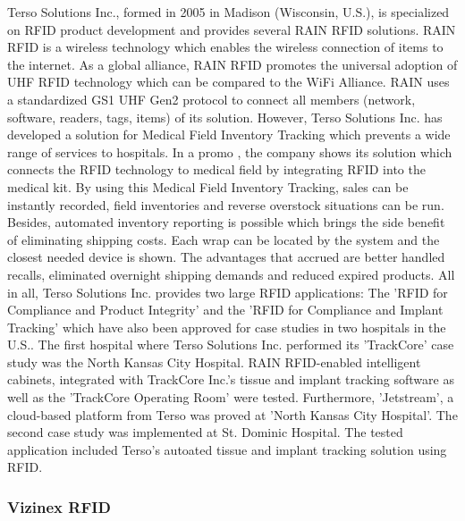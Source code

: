 Terso Solutions Inc., formed in 2005 in Madison (Wisconsin, U.S.), is specialized on RFID product development and provides several \ac{RAIN} RFID solutions. RAIN RFID \cite{rainrfid} is a wireless technology which enables the wireless connection of items to the internet. As a global alliance, RAIN RFID promotes the universal adoption of \ac{UHF} RFID technology which can be compared to the WiFi Alliance. RAIN uses a standardized GS1 UHF Gen2 protocol to connect all members (network, software, readers, tags, items) of its solution.
However, Terso Solutions Inc. has developed a solution for Medical Field Inventory Tracking which prevents a wide range of services to hospitals. In a promo \cite{terso_video}, the company shows its solution which connects the RFID technology to medical field by integrating RFID into the medical kit. By using this Medical Field Inventory Tracking, sales can be instantly recorded, field inventories and reverse overstock situations can be run. Besides, automated inventory reporting is possible which brings the side benefit of eliminating shipping costs. Each wrap can be located by the system and the closest needed device is shown. The advantages that accrued are better handled recalls, eliminated overnight shipping demands and reduced expired products. All in all, Terso Solutions Inc. provides two large RFID applications: The 'RFID for Compliance and Product Integrity' and the 'RFID for Compliance and Implant Tracking' which have also been approved for case studies in two hospitals in the U.S.. The first hospital where Terso Solutions Inc. performed its 'TrackCore' case study was the North Kansas City Hospital. RAIN RFID-enabled intelligent cabinets, integrated with TrackCore Inc.'s tissue and implant tracking software as well as the 'TrackCore Operating Room' were tested. Furthermore, 'Jetstream', a cloud-based platform from Terso was proved at 'North Kansas City Hospital'. The second case study was implemented at St. Dominic Hospital. The tested application included Terso's autoated tissue and implant tracking solution using RFID.

\subsubsection{Vizinex RFID}

